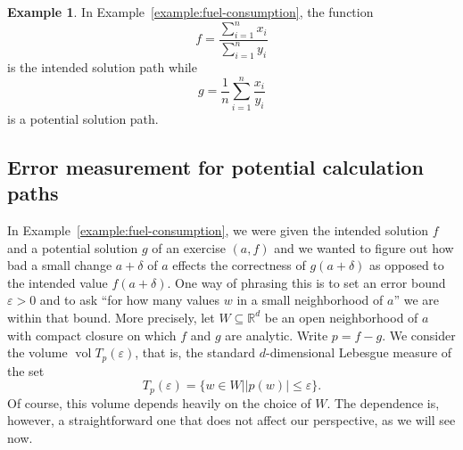 \documentclass[11pt]{amsart}
\numberwithin{equation}{section}
\theoremstyle{plain}
\theoremstyle{definition}
\newtheorem{remark}[theorem]{Remark}
\newtheorem{example}[theorem]{Example}
\newcommand{\R}{\mathbb{R}}
\newcommand{\gt}{>}
\begin{document}
\begin{example}\label{example:alternative-solution-path}
    In Example~\ref{example:fuel-consumption}, the function
    \[
    f = \frac{\sum_{i = 1}^n x_i}{\sum_{i = 1}^n y_i}
    \]
    is the intended solution path while 
    \[
     g = \frac{1}{n} \sum_{i = 1}^n \frac{x_i}{y_i} 
    \]
    is a potential solution path.
\end{example}

\subsection{Error measurement for potential calculation paths}
In Example~\ref{example:fuel-consumption}, we were given the intended solution $f$ and a potential solution $g$ of an exercise $(a,f)$ and we wanted to figure out how bad a small change $a + \delta$ of $a$ effects the correctness of $g(a + \delta)$ as opposed to the intended value $f(a + \delta)$. One way of phrasing this is to set an error bound $\varepsilon > 0$ and to ask ``for how many values $w$ in a small neighborhood of $a$'' we are within that bound. More precisely, let $W\subseteq \R^d$ be an open neighborhood of $a$ with compact closure on which $f$ and $g$ are analytic. Write $p = f-g$. We consider the volume $\operatorname{vol} T_p(\varepsilon)$, that is, the standard $d$-dimensional Lebesgue measure of the set
\[
T_{p}(\varepsilon) =\{ w \in W \mid \vert p(w)\vert \leq \varepsilon \}.
\]
Of course, this volume depends heavily on the choice of $W$. The dependence is, however, a straightforward one that does not affect our perspective, as we will see now.
\end{document}
